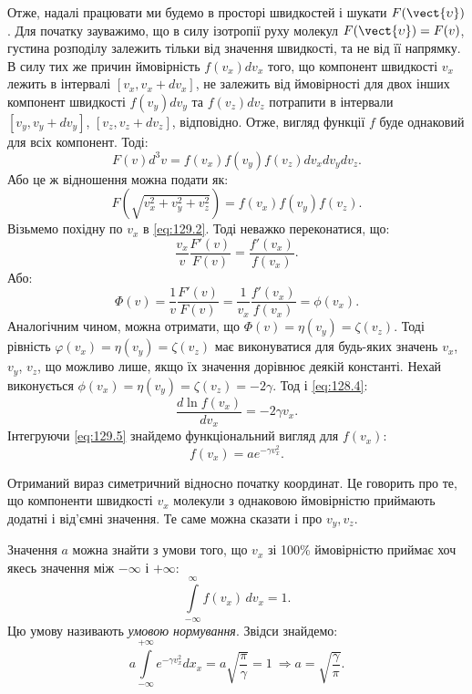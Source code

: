 Отже, надалі працювати ми будемо в просторі швидкостей і шукати $F(\vect{\upsilon})$.
Для початку зауважимо, що в силу ізотропії руху молекул $ F(\vect{\upsilon}) = F(v) $, густина розподілу залежить тільки від значення швидкості, та не від її напрямку.  В силу тих же причин ймовірність $f(v_x) dv_x$ того, що компонент швидкості $v_x$ лежить в інтервалі $[v_x, v_x+dv_x]$, не залежить від ймовірності для двох інших компонент швидкості $f(v_y) dv_y$ та $f(v_z) dv_z$ потрапити в інтервали $[v_y, v_y+dv_y]$, $[v_z, v_z+dv_z]$, відповідно.
Отже, вигляд функції $f$ буде однаковий для всіх компонент. Тоді:
%
\begin{equation}\label{eq:129.1}
    F(v) d^3 v = f(v_x) f(v_y) f(v_z) dv_x dv_y dv_z.
\end{equation}
%
Або це ж відношення можна подати як:
%
\begin{equation}\label{eq:129.2}
    F\left(\sqrt{v_x^2 + v_y^2 + v_z^2}\right) = f(v_x) f(v_y) f(v_z).
\end{equation}
%
Візьмемо похідну по $v_x$ в \eqref{eq:129.2}. Тоді неважко переконатися, що:
%
\begin{equation}\label{eq:129.3}
    \frac{v_x}{v} \frac{F'(v)}{F(v)} = \frac{f'(v_x)}{f(v_x)}.
\end{equation}
%
Або:
%
\begin{equation}\label{eq:129.4}
    \Phi(v) = \frac1v \frac{F'(v)}{F(v)} = \frac1{v_x}  \frac{f'(v_x)}{f(v_x)} = \phi(v_x).
\end{equation}
%
Аналогічним чином, можна отримати, що $\Phi(v) = \eta(v_y) = \zeta(v_z)$. Тоді рівність $\varphi(v_x) = \eta(v_y) = \zeta(v_z)$ має виконуватися для будь-яких значень $v_x$, $v_y$, $v_z$, що можливо лише, якщо їх значення дорівнює деякій константі. Нехай виконується  $\phi(v_x) = \eta(v_y) = \zeta(v_z) = -2\gamma$. Тод і \eqref{eq:128.4}:
%
\begin{equation}\label{eq:129.5}
   \frac{d \ln f(v_x)} {dv_x}= -2\gamma v_x.
\end{equation}
%
Інтегруючи \eqref{eq:129.5} знайдемо функціональний вигляд для $f(v_x)$:
%
\begin{equation}
    f(v_x) = a e^{-\gamma v_x^2}.
\end{equation}

Отриманий вираз симетричний відносно початку координат. Це говорить про те, що компоненти швидкості $v_x$ молекули з однаковою ймовірністю приймають додатні і від’ємні значення. Те саме можна сказати і про $v_y, v_z$.

Значення $a$ можна знайти з умови того, що $v_x$ зі 100\% ймовірністю приймає хоч якесь значення між $-\infty$ і $+\infty$:
%
\begin{equation}\label{eq:129.7}
    \int\limits_{-\infty}^{\infty} f(v_x)\, dv_x = 1.
\end{equation}
%
Цю умову називають \emph{умовою нормування}. Звідси знайдемо:
%
\begin{equation}\label{eq:129.8}
    a\int\limits_{-\infty}^{+\infty}e^{-\gamma v_x^2}dx_x=a\sqrt{\frac{\pi}{\gamma}}=1\ \Rightarrow a = \sqrt{\frac{\gamma}{\pi}}.
\end{equation}
%

